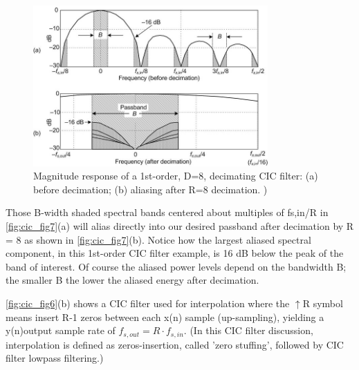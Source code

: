 \begin{figure}[!ht]
    \centering
    \includegraphics[width=0.8\textwidth]{images/CIC_Filter/fig 7_83485.jpg}
    \caption{Magnitude response of a 1st-order, D=8, decimating CIC filter: (a) before decimation; (b) aliasing after R=8 decimation. )}
    \label{fig:cic_fig7}
\end{figure}

Those B-width shaded spectral bands centered about multiples of fs,in/R in \autoref{fig:cic_fig7}(a) will alias directly into our desired passband after decimation by R = 8 as shown in \autoref{fig:cic_fig7}(b). Notice how the largest aliased spectral component, in this 1st-order CIC filter example, is 16 dB below the peak of the band of interest. Of course the aliased power levels depend on the bandwidth B; the smaller B the lower the aliased energy after decimation.

\autoref{fig:cic_fig6}(b) shows a CIC filter used for interpolation where the $\uparrow$R symbol means insert R-1 zeros between each x(n) sample (up-sampling), yielding a y(n)output sample rate of $f_{s,out}=R\cdot f_{s,in}$. (In this CIC filter discussion, interpolation is defined as zeros-insertion, called 'zero stuffing', followed by CIC filter lowpass filtering.)

